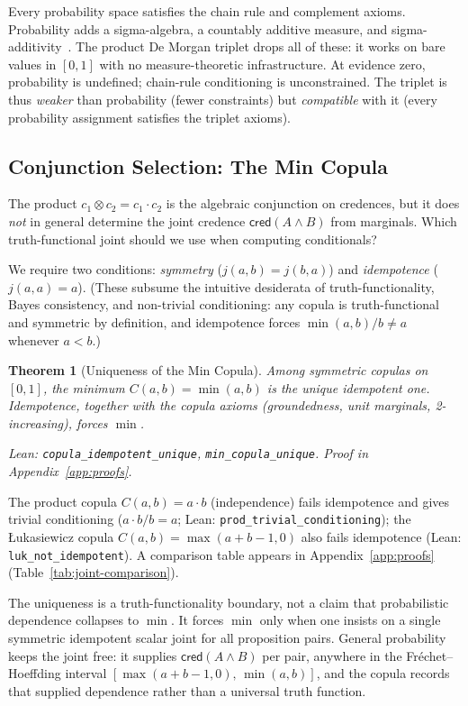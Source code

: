 \documentclass[11pt,a4paper]{article}
\newtheorem{theorem}{Theorem}[section]
\newcommand{\cred}{\mathsf{cred}}
\newcommand{\conjc}{\otimes}
\begin{document}
Every probability space satisfies the chain rule and complement
axioms.
Probability adds a sigma-algebra, a countably additive measure,
and sigma-additivity~\cite{jaynes2003,cox1961}.
The product De Morgan triplet drops all of these: it works on
bare values in $[0,1]$ with no measure-theoretic infrastructure.
At evidence zero, probability is undefined;
chain-rule conditioning is unconstrained.
The triplet is thus \emph{weaker} than probability (fewer
constraints) but \emph{compatible} with it (every probability
assignment satisfies the triplet axioms).

\subsection{Conjunction Selection: The Min Copula}
\label{sec:min-copula}

The product $c_1 \conjc c_2 = c_1 \cdot c_2$ is the algebraic
conjunction on credences, but it does \emph{not} in general
determine the joint credence $\cred(A \land B)$ from
marginals.
Which truth-functional joint should we use when computing
conditionals?

We require two conditions: \emph{symmetry} ($j(a,b) = j(b,a)$)
and \emph{idempotence} ($j(a,a) = a$).
(These subsume the intuitive desiderata of truth-functionality,
Bayes consistency, and non-trivial conditioning: any copula is
truth-functional and symmetric by definition, and idempotence
forces $\min(a,b)/b \neq a$ whenever $a < b$.)

\begin{theorem}[Uniqueness of the Min Copula]
\label{thm:min-copula-unique}
Among symmetric copulas on $[0,1]$, the minimum
$C(a,b) = \min(a,b)$ is the unique idempotent one.
Idempotence, together with the copula axioms (groundedness, unit
marginals, 2-increasing), forces $\min$.

Lean: \texttt{copula\_idempotent\_unique},
\texttt{min\_copula\_unique}.
Proof in Appendix~\ref{app:proofs}.
\end{theorem}

The product copula $C(a,b) = a \cdot b$ (independence) fails
idempotence and gives trivial conditioning
($a \cdot b / b = a$; Lean: \texttt{prod\_trivial\_conditioning});
the \L ukasiewicz copula $C(a,b) = \max(a+b-1, 0)$ also fails
idempotence (Lean: \texttt{luk\_not\_idempotent}).
A comparison table appears in Appendix~\ref{app:proofs}
(Table~\ref{tab:joint-comparison}).

The uniqueness is a truth-functionality boundary, not a claim that
probabilistic dependence collapses to $\min$.  It forces $\min$ only
when one insists on a single symmetric idempotent scalar joint for all
proposition pairs.  General probability keeps the joint free: it
supplies $\cred(A \land B)$ per pair, anywhere in the
Fr\'echet--Hoeffding interval
$[\max(a+b-1,0),\, \min(a,b)]$, and the copula records that supplied
dependence rather than a universal truth function.
\end{document}
